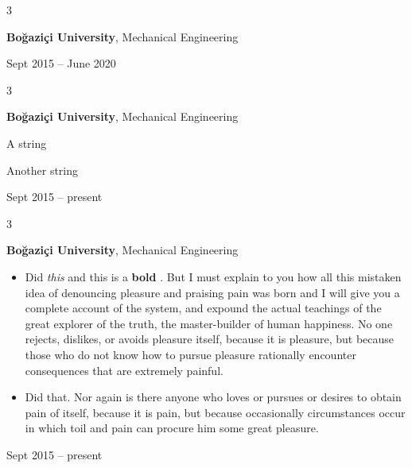 \documentclass[10pt, letterpaper]{article}
\newenvironment{summary}{
    \begin{description}[
        topsep=0.10 cm,
        parsep=0.10 cm,
        partopsep=0pt,
        itemsep=0pt,
        leftmargin=0.4 cm + 10pt
    ]
}{
    \end{description}
} %
\newenvironment{highlights}{
    \begin{itemize}[
        topsep=0.10 cm,
        parsep=0.10 cm,
        partopsep=0pt,
        itemsep=0pt,
        leftmargin=0.4 cm + 10pt
    ]
}{
    \end{itemize}
} %
\newenvironment{threecolentry}[3][]{
    \onecolentry
    \def\thirdColumn{#3}
    \setcolumnwidth{1 cm, \fill, 4.5 cm}
    \begin{paracol}{3}
    {\raggedright #2} \switchcolumn
}{
    \switchcolumn \raggedleft \thirdColumn
    \end{paracol}
    \endonecolentry
} %
\let\hrefWithoutArrow\href
\renewcommand{\href}[2]{\hrefWithoutArrow{#1}{\ifthenelse{\equal{#2}{}}{ }{#2 }\raisebox{.15ex}{\footnotesize \faExternalLink*}}}
\begin{document}
        \vspace{0.2 cm}

        \begin{threecolentry}{\textbf{}}{
            Sept 2015 – June 2020
        }
            \textbf{Boğaziçi University}, Mechanical Engineering
        \end{threecolentry}

        \vspace{0.2 cm}

        \begin{threecolentry}{\textbf{}}{
            Sept 2015 – present
        }
            \textbf{Boğaziçi University}, Mechanical Engineering
            \begin{summary}
                \item A string
                \item Another string
            \end{summary}
        \end{threecolentry}

        \vspace{0.2 cm}

        \begin{threecolentry}{\textbf{}}{
            Sept 2015 – present
        }
            \textbf{Boğaziçi University}, Mechanical Engineering
            \begin{highlights}
                \item Did \textit{this} and this is a \textbf{bold} \href{https://example.com}{link}. But I must explain to you how all this mistaken idea of denouncing pleasure and praising pain was born and I will give you a complete account of the system, and expound the actual teachings of the great explorer of the truth, the master-builder of human happiness. No one rejects, dislikes, or avoids pleasure itself, because it is pleasure, but because those who do not know how to pursue pleasure rationally encounter consequences that are extremely painful.
                \item Did that. Nor again is there anyone who loves or pursues or desires to obtain pain of itself, because it is pain, but because occasionally circumstances occur in which toil and pain can procure him some great pleasure.
            \end{highlights}
        \end{threecolentry}

        \vspace{0.2 cm}
\end{document}
